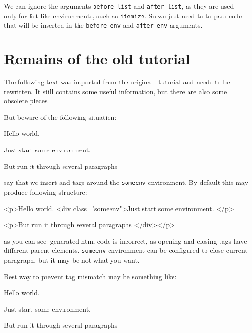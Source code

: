 We can ignore the arguments \texttt{before-list} and \texttt{after-list}, as they
are used only for list like environments, such as \texttt{itemize}. 
So we just need to to pass code that will be inserted in the \texttt{before env}
and \texttt{after env} arguments.




\section{Remains of the old tutorial}


The following text was imported from the original \texfourht\ tutorial and needs to be
rewritten. It still contains some useful information, but there are also some obsolete pieces.


But beware of the following situation:

\begin{texsource}
Hello world.
\begin{someenv}
Just start some environment.

But run it through several paragraphs
\end{someenv}
\end{texsource}

say that we insert
 and
 tags around  the \texttt{someenv}
environment. By default this may produce following structure:

\begin{htmlsource}
<p>Hello world.
<div class="someenv">Just start some environment.
</p>

<p>But run it through several paragraphs
</div></p>
\end{htmlsource}

as you can see, generated html code is incorrect, as opening and closing
 tags have different parent elements. \texttt{someenv} environment can
be configured to close current paragraph, but it may be not what you
want.

Best way to prevent tag mismatch may be something like:

\begin{texsource}
Hello world.
\begin{someenv}
Just start some environment.
\end{someenv}

\begin{someenv}
But run it through several paragraphs
\end{someenv}
\end{texsource}

